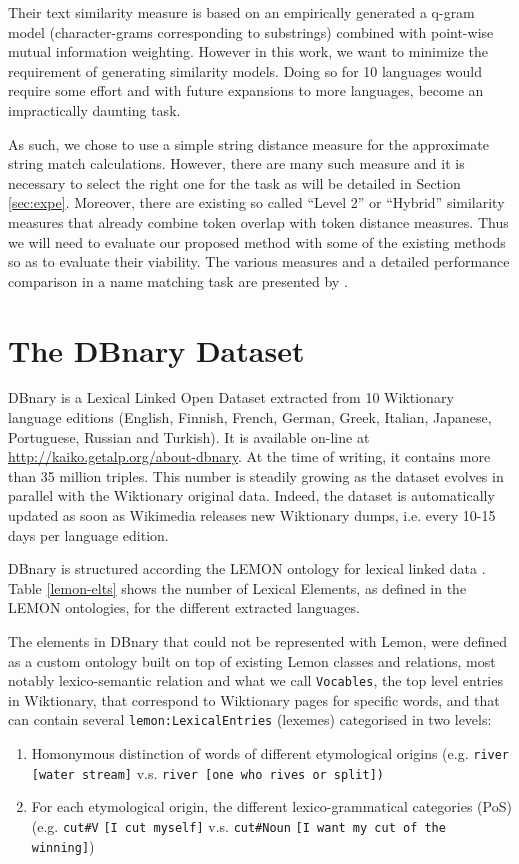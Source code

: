 \documentclass[10pt, a4paper]{article}
\begin{document}
  Their text similarity measure is based on an empirically generated a q-gram model (character-grams corresponding to substrings) combined with point-wise mutual information weighting. However in this work, we want to minimize the requirement of generating similarity models. Doing so for 10 languages would require some effort and with future expansions to more languages, become an impractically daunting task. 
 
 As such, we chose to use a simple string distance measure for the approximate string match calculations. However, there are many such measure and it is necessary to select the right one for the task as will be detailed in Section \ref{sec:expe}. Moreover, there are existing so called ``Level 2'' or ``Hybrid'' similarity measures that already combine token overlap with token distance measures. Thus we will need to evaluate our proposed method with some of the existing methods so as to evaluate their viability. The various measures and a detailed performance comparison in a name matching task are presented by \cite{Cohen2003}.

\section{The DBnary Dataset}

DBnary is a Lexical Linked Open Dataset extracted from 10 Wiktionary language editions (English, Finnish, French, German, Greek, Italian, Japanese, Portuguese, Russian and Turkish). It is available on-line at \url{http://kaiko.getalp.org/about-dbnary}. At the time of writing, it contains more than 35 million triples. This number is steadily growing as the dataset evolves in parallel with the Wiktionary original data. Indeed, the dataset is automatically updated as soon as Wikimedia releases new Wiktionary dumps, i.e. every 10-15 days per language edition. 

DBnary is structured according the LEMON ontology for lexical linked data \cite{DBLP:conf/esws/McCraeSC11}. Table \ref{lemon-elts} shows the number of Lexical Elements, as defined in the LEMON ontologies, for the different extracted languages. 

The elements in DBnary that could not be represented with Lemon, were defined as a custom ontology built on top of existing Lemon classes and relations, most notably lexico-semantic relation and what we call \verb|Vocables|, the top level entries in Wiktionary, that correspond to Wiktionary pages for specific words, and that can contain several \verb|lemon:LexicalEntries| (lexemes) categorised in two levels:
\begin{enumerate}
	\item Homonymous distinction of words of different etymological origins (e.g. \verb|river [water stream]| v.s. \verb|river [one who rives or split])|
	\item For each etymological origin, the different lexico-grammatical categories (PoS) (e.g. \verb|cut#V| \verb|[I cut myself]| v.s. \verb|cut#Noun| \verb|[I want my cut of the winning]|)
\end{enumerate}
\end{document}
